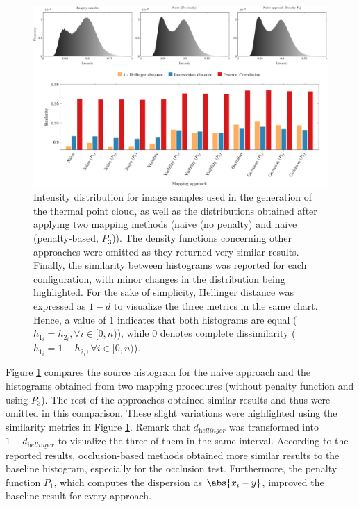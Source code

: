 \begin{figure}
    \centering
    \includegraphics[width=\linewidth]{figs/thermal_projection/histogram_composition.png}
	\caption{Intensity distribution for image samples used in the generation of the thermal point cloud, as well as the distributions obtained after applying two mapping methods (naive (no penalty) and naive (penalty-based, $P_3$)). The density functions concerning other approaches were omitted as they returned very similar results. Finally, the similarity between histograms was reported for each configuration, with minor changes in the distribution being highlighted. For the sake of simplicity, Hellinger distance was expressed as $1 - d$ to visualize the three metrics in the same chart. Hence, a value of 1 indicates that both histograms are equal ($h_{1_{i}} = h_{2_{i}}, \forall i \in [0, n)$), while 0 denotes complete dissimilarity ($h_{1_{i}} = 1 - h_{2_{i}}, \forall i \in [0, n)$).}
	\label{fig:thermal_histogram_results}
\end{figure}

Figure \ref{fig:thermal_histogram_results} compares the source histogram for the naive approach and the histograms obtained from two mapping procedures (without penalty function and using $P_3$). The rest of the approaches obtained similar results and thus were omitted in this comparison. These slight variations were highlighted using the similarity metrics in Figure \ref{fig:thermal_histogram_results}. Remark that $d_{\textit{hellinger}}$ was transformed into $1 - d_{\textit{hellinger}}$ to visualize the three of them in the same interval. According to the reported results, occlusion-based methods obtained more similar results to the baseline histogram, especially for the occlusion test. Furthermore, the penalty function $P_1$, which computes the dispersion as $\abs{x_i - y}$, improved the baseline result for every approach.

